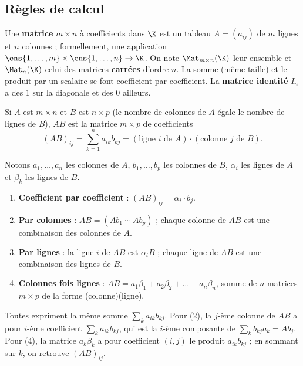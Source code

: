 \subsection{Règles de calcul}
\begin{definition}[Matrices]
Une \textbf{matrice} $m\times n$ à coefficients dans $\K$ est un tableau $A=(a_{ij})$ de $m$ lignes et $n$ colonnes ; formellement, une application $\ens{1,\dots,m}\times\ens{1,\dots,n}\to\K$. On note $\Mat_{m\times n}(\K)$ leur ensemble et $\Mat_n(\K)$ celui des matrices \textbf{carrées} d'ordre $n$. La somme (même taille) et le produit par un scalaire se font coefficient par coefficient. La \textbf{matrice identité} $I_n$ a des $1$ sur la diagonale et des $0$ ailleurs.
\end{definition}
\begin{definition}\label{def-produit}
Si $A$ est $m\times n$ et $B$ est $n\times p$ (le nombre de colonnes de $A$ égale le nombre de lignes de $B$), $AB$ est la matrice $m\times p$ de coefficients
\[(AB)_{ij}=\sum_{k=1}^n a_{ik}b_{kj}=(\text{ligne } i \text{ de } A)\cdot(\text{colonne } j \text{ de } B).\]
\end{definition}
\begin{proposition}\label{prop-quatre}
Notons $a_1,\dots,a_n$ les colonnes de $A$, $b_1,\dots,b_p$ les colonnes de $B$, $\alpha_i$ les lignes de $A$ et $\beta_k$ les lignes de $B$.
\begin{enumerate}
\item \textbf{Coefficient par coefficient} : $(AB)_{ij}=\alpha_i\cdot b_j$.
\item \textbf{Par colonnes} : $AB=(Ab_1\ \cdots\ Ab_p)$ ; chaque colonne de $AB$ est une combinaison des colonnes de $A$.
\item \textbf{Par lignes} : la ligne $i$ de $AB$ est $\alpha_iB$ ; chaque ligne de $AB$ est une combinaison des lignes de $B$.
\item \textbf{Colonnes fois lignes} : $AB=a_1\beta_1+a_2\beta_2+\dots+a_n\beta_n$, somme de $n$ matrices $m\times p$ de la forme (colonne)(ligne).
\end{enumerate}
\end{proposition}
\begin{preuve}
Toutes expriment la même somme $\sum_k a_{ik}b_{kj}$. Pour (2), la $j$-ème colonne de $AB$ a pour $i$-ème coefficient $\sum_k a_{ik}b_{kj}$, qui est la $i$-ème composante de $\sum_k b_{kj}a_k=Ab_j$. Pour (4), la matrice $a_k\beta_k$ a pour coefficient $(i,j)$ le produit $a_{ik}b_{kj}$ ; en sommant sur $k$, on retrouve $(AB)_{ij}$.
\end{preuve}
